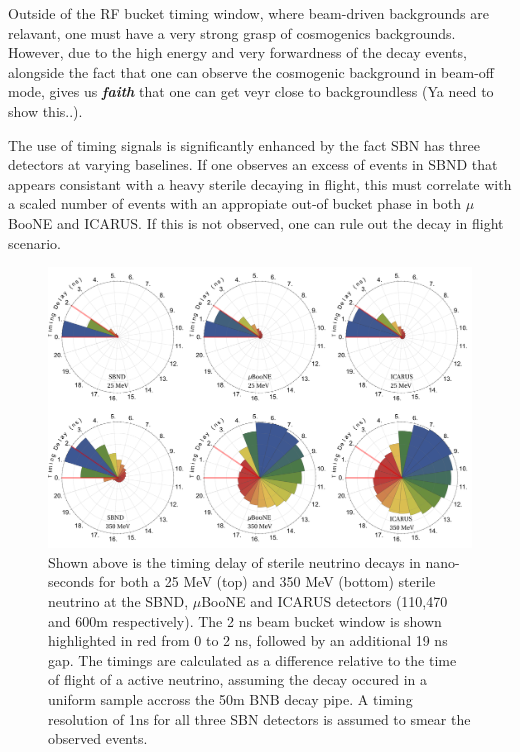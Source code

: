 \documentclass[11pt, a4paper]{article}
\begin{document}
Outside of the RF bucket timing window, where beam-driven backgrounds are relavant, one must have a very strong grasp of cosmogenics backgrounds. However, due to the high energy and very forwardness of the decay events, alongside the fact that one can observe the cosmogenic background in beam-off mode, gives us {\bf {\emph{faith}}} that one can get veyr close to backgroundless (Ya need to show this..). 

The use of timing signals is significantly enhanced by the fact SBN has three detectors at varying baselines. If one observes an excess of events in SBND that appears consistant with a heavy sterile decaying in flight, this must correlate with a scaled number of events with an appropiate out-of bucket phase in both $\mu$BooNE and ICARUS. If this is not observed, one can rule out the decay in flight scenario.


\begin{figure}[t]
\center
\includegraphics[width=\textwidth]{figures/timing.pdf}
\caption{\label{fig:timing} Shown above is the timing delay of sterile neutrino decays in nano-seconds for both a 25 MeV (top) and 350 MeV (bottom) sterile neutrino at the SBND, $\mu$BooNE and ICARUS detectors (110,470 and 600m respectively). The 2 ns beam bucket window is shown highlighted in red from 0 to 2 ns, followed by an additional 19 ns gap. The timings are calculated as a difference relative to the time of flight of a active neutrino, assuming the decay occured in a uniform sample accross the 50m BNB decay pipe. A timing resolution of 1ns for all three SBN detectors is assumed to smear the observed events.}
\end{figure}
\end{document}
